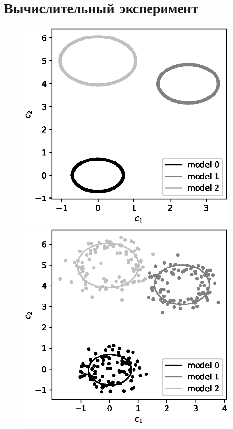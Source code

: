 \documentclass[12pt]{a&t}
\begin{document}
\section{Вычислительный эксперимент}
\begin{figure}[h!]
	\includegraphics[height = 0.2\textheight]{900.eps}
	\includegraphics[height = 0.2\textheight]{901.eps}

\end{figure}
\end{document}
